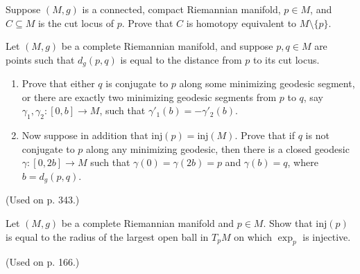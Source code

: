 \begin{exercise}\label{prob:cut-locus-homotopy-equivalence}
Suppose $(M,g)$ is a connected, compact Riemannian manifold, $p \in M$, and $C \subseteq M$ is the cut locus of $p$. Prove that $C$ is homotopy equivalent to $M \setminus \{p\}$.
\end{exercise}

\begin{exercise}\label{prob:distance-cut-locus}
Let $(M,g)$ be a complete Riemannian manifold, and suppose $p,q \in M$ are points such that $d_g(p,q)$ is equal to the distance from $p$ to its cut locus.

\begin{enumerate}
\item[(a)] Prove that either $q$ is conjugate to $p$ along some minimizing geodesic segment, or there are exactly two minimizing geodesic segments from $p$ to $q$, say $\gamma_1, \gamma_2: [0,b] \to M$, such that $\gamma'_1(b) = -\gamma'_2(b)$.

\item[(b)] Now suppose in addition that $\text{inj}(p) = \text{inj}(M)$. Prove that if $q$ is not conjugate to $p$ along any minimizing geodesic, then there is a closed geodesic $\gamma: [0,2b] \to M$ such that $\gamma(0) = \gamma(2b) = p$ and $\gamma(b) = q$, where $b = d_g(p,q)$.
\end{enumerate}

(Used on p. 343.)
\end{exercise}

\begin{exercise}\label{prob:injectivity-radius-exponential}
Let $(M,g)$ be a complete Riemannian manifold and $p \in M$. Show that $\text{inj}(p)$ is equal to the radius of the largest open ball in $T_p M$ on which $\exp_p$ is injective.

(Used on p. 166.)
\end{exercise}